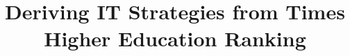 \documentclass[sigconf]{acmart}
\begin{document}
\title{Deriving IT Strategies from Times Higher Education Ranking}




%
%
%
%
%
%
%
\end{document}

